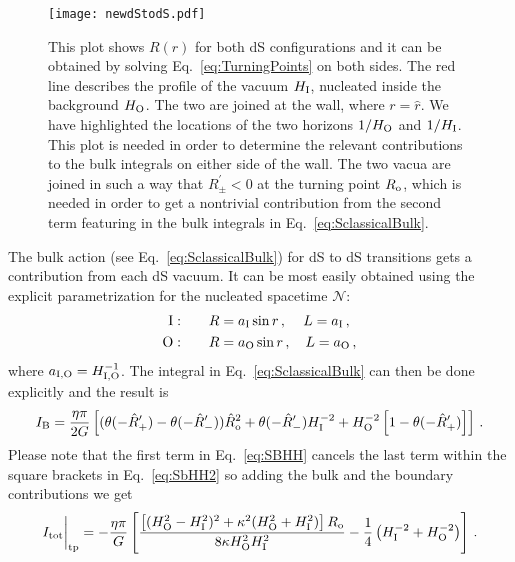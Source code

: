 \documentclass[11pt,a4paper]{article}
\begin{document}
\begin{figure}[h!] 
\begin{center} 
\texttt{[image: newdStodS.pdf]} 
\caption{\footnotesize{This plot shows $R(r)$ for both dS configurations and it can be obtained by solving Eq.~\eqref{eq:TurningPoints} on both sides. The red line describes the profile of the vacuum $H_{\rm I}$, nucleated inside the background $H_{\rm O}$. The two are joined at the wall, where $r = \hat r$. We have highlighted the locations of the two horizons $1/H_{\rm O}$ and $1/H_{\rm I}$. This plot is needed in order to determine the relevant contributions to the bulk integrals on either side of the wall. The two vacua are joined in such a way that $R^{\prime}_{\pm} < 0$ at the turning point $R_{\rm o}$, which is needed in order to get a nontrivial contribution from the second term featuring in the bulk integrals in Eq.~\eqref{eq:SclassicalBulk}.}}
\end{center} 
\end{figure} 
\vspace{0.2cm}
The bulk action (see Eq.~\eqref{eq:SclassicalBulk}) for dS to dS transitions gets a contribution from each dS vacuum. It can be most easily obtained using the explicit parametrization for the nucleated spacetime $\mathcal{N}$:
\begin{equation}
\begin{split}
\text{I}:& \qquad R = a_{\rm I} \sin r \,, \, \quad L = a_{\rm I} \,, \\
\text{O}:&\qquad R = a_{\rm O}\sin r \,, \quad L = a_{\rm O} \,,
\label{eq:aR}
\end{split}
\end{equation}
where $a_{\rm I,O} = H_{\rm I, O}^{-1}$. The integral in Eq.~\eqref{eq:SclassicalBulk} can then be done explicitly and the result is
\begin{equation}
I_{\rm B} = \frac{\eta\pi}{2G}\left[(\theta(-\hat{R}'_{+})-\theta(-\hat{R}'_{-}))\hat{R}_{{\rm o}}^{2}+\theta(-\hat R^{\prime}_{-}) H_{{\rm I}}^{-2}+H_{\rm O}^{-2} \left[1 - \theta(-\hat R^{\prime}_{+})\right]\right]\,.
\label{eq:SBHH}
\end{equation}
Please note that the first term in Eq.~\eqref{eq:SBHH} cancels the last term within the square brackets in Eq.~\eqref{eq:SbHH2} so adding the bulk and the boundary contributions we get
\begin{equation}
I_{\rm tot}\bigg|_{\rm tp} = -\frac{\eta \pi}{G} \left[\frac{\left[(H_{\rm O}^{2} - H_{\rm I}^{2})^{2}+\kappa^{2} (H_{\rm O}^{2} + H_{\rm I}^{2})\right] R_{{\rm o}}}{8 \kappa H_{\rm O}^{2} H_{\rm I}^{2}}-\frac{1}{4} \left(H_{\rm I}^{-2} + H_{\rm O}^{-2}\right)\right] \,.\label{eq:HH}
\end{equation}
\end{document}
